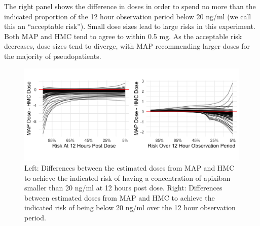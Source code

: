 The right panel shows the difference in doses in order to spend no more than the indicated proportion of the 12 hour observation period below 20 ng/ml (we call this an “acceptable risk”).  Small dose sizes lead to large risks in this experiment.  Both MAP and HMC tend to agree to within 0.5 mg.  As the acceptable risk decreases, dose sizes tend to diverge, with MAP recommending larger doses for the majority of pseudopatients.

\begin{figure}
	\centering
	\includegraphics[width=\linewidth]{figs/experiments}
	\caption{Left: Differences between the estimated doses from MAP and HMC to achieve the indicated risk of having a concentration of apixiban smaller than 20 ng/ml at 12 hours post dose. Right: Differences between estimated doses from MAP and HMC to achieve the indicated risk of being below 20 ng/ml over the 12 hour observation period.}
	\label{fig:fig7}
\end{figure}



